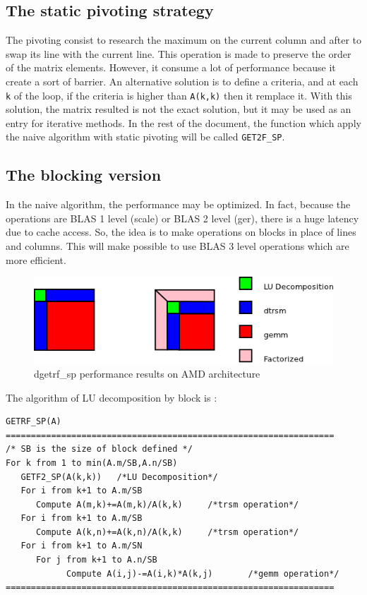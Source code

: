 \documentclass{report}
\begin{document}
\subsection{The static pivoting strategy}
The pivoting consist to research the maximum on the current column and after to swap its line with the current line. This operation is made to preserve the order of the matrix elements. However, it consume a lot of performance because it create a sort of barrier. An alternative solution is to define a criteria, and at each \texttt{k} of the loop, if the criteria is higher than \texttt{A(k,k)} then it remplace it. With this solution, the matrix resulted is not the exact solution, but it may be used as an entry for iterative methods. In the rest of the document, the function which apply the naive algorithm with static pivoting will be called \texttt{GET2F\_SP}.
\subsection{The blocking version}
In the naive algorithm, the performance may be optimized. In fact, because the operations are BLAS 1 level (scale) or BLAS 2 level (ger), there is a huge latency due to cache access. So, the idea is to make operations on blocks in place of lines and columns. This will make possible to use BLAS 3 level operations which are more efficient.\\
\begin{figure}[!ht]
\begin{center}
\includegraphics[width=\textwidth]{lu_decomposition_block.png} 
\end{center}
\caption{dgetrf\_sp performance results on AMD architecture}
\end{figure}

The algorithm of LU decomposition by block is :
\begin{verbatim}
GETRF_SP(A)
=================================================================
/* SB is the size of block defined */
For k from 1 to min(A.m/SB,A.n/SB)
   GETF2_SP(A(k,k))   /*LU Decomposition*/
   For i from k+1 to A.m/SB
      Compute A(m,k)+=A(m,k)/A(k,k)		/*trsm operation*/
   For i from k+1 to A.m/SB
      Compute A(k,n)+=A(k,n)/A(k,k)		/*trsm operation*/
   For i from k+1 to A.m/SN
      For j from k+1 to A.n/SB
            Compute A(i,j)-=A(i,k)*A(k,j)		/*gemm operation*/
=================================================================
\end{verbatim}
\end{document}
